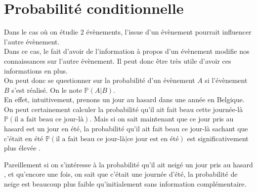 \newpage
\section{Probabilité conditionnelle}
Dans le cas où on étudie 2 évènements, l'issue d'un évènement pourrait influencer l'autre évènement.\\
Dans ce cas, le fait d'avoir de l'information à propos d'un évènement
 modifie nos connaissances sur l'autre évènement. 
Il peut donc être très utile d'avoir ces informations en plus.\\

On peut donc se questionner sur la probabilité d'un évènement $A$ si l'évènement $B$ s'est réalisé. On le note $\mathbb{P}(A|B)$.\\

En effet, intuitivement, prenons un jour au hasard dans une année en Belgique.
 On peut certainement calculer la probabilité qu'il ait fait beau cette journée-là $\mathbb{P}(\text{il a fait beau ce jour-là})$. 
 Mais si on sait maintenant que ce jour pris au hasard est un jour en été, 
 la probabilité qu'il ait fait beau ce jour-là sachant que c'était en été $\mathbb{P}(\text{il a fait beau ce jour-là} | \text{ce jour est en été})$ 
 est significativement plus élevée .

 Pareillement si on s'intéresse à la probabilité qu'il ait neigé un jour pris au hasard , 
 et qu'encore une fois, on sait que c'était une journée d'été, la probabilité de neige est beaucoup plus faible qu'initialement sans information complémentaire.\\


